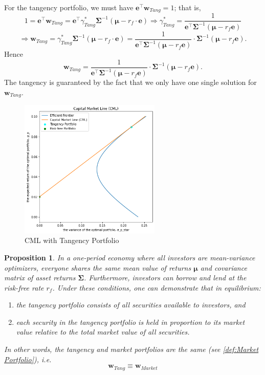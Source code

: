 \documentclass[13pt]{article}
\newtheorem{proposition}[theorem]{Proposition}
\theoremstyle{definition}
\theoremstyle{remark}
\begin{document}
For the tangency portfolio, we must have $\bm{e}^{\top}\bm{w}_{Tang}=1$; that is,
\[
1=\bm{e}^{\top}\bm{w}_{Tang}=\bm{e}^{\top}\gamma_{Tang}^* \mathbf{\Sigma}^{-1}\left(\bm{\mu}-r_{f} \cdot \bm{e}\right) \Longrightarrow \gamma_{Tang}^*=\frac{1}{\bm{e}^{\top} \mathbf{\Sigma}^{-1}\left(\bm{\mu}-r_{f} \bm{e}\right)}
\]
$$\Longrightarrow
\bm{w}_{Tang}=\gamma_{Tang}^*\mathbf{\Sigma}^{-1}\left(\bm{\mu}-r_{f} \cdot \bm{e}\right)=\frac{1}{\bm{e}^{\top} \mathbf{\Sigma}^{-1}\left(\bm{\mu}-r_{f} \bm{e}\right)} \cdot \mathbf{\Sigma}^{-1}\left(\bm{\mu}-r_{f} \bm{e}\right) .
$$
Hence
{\color{C6}$$
\bm{w}_{Tang}=\frac{1}{\bm{e}^{\top} \mathbf{\Sigma}^{-1}\left(\bm{\mu}-r_{f} \bm{e}\right)} \cdot \mathbf{\Sigma}^{-1}\left(\bm{\mu}-r_{f} \bm{e}\right).
$$}
The tangency is guaranteed by the fact that we only have one single solution for $\bm{w}_{Tang}$.
\begin{figure}[!htp]
    \centering
    \includegraphics[width=0.6\textwidth]{CML with Tangency Portfolio.png}
    \caption{CML with Tangency Portfolio}
    \label{fig:Capital Market Line with Tangency}
\end{figure}

\begin{proposition}\label{prop:tangency portfolio is market portfolio}
   In a one-period economy where all investors are mean-variance optimizers, everyone shares the same mean value of returns $\bm{\mu}$ and covariance matrix of asset returns $\mathbf{\Sigma}$. Furthermore, investors can borrow and lend at the risk-free rate $r_{f}$. Under these conditions, one can demonstrate that in equilibrium:
\begin{enumerate}[label=(\alph*)]
  \item the tangency portfolio consists of all securities available to investors, and
  \item each security in the tangency portfolio is held in proportion to its market value relative to the total market value of all securities.
  \end{enumerate}
  In other words, the tangency and market portfolios are the same (see \cref{def:Market Portfolio}), i.e.
$$
\bm{w}_{Tang } \equiv \bm{w}_{Market}
$$
\end{proposition}
\end{document}
